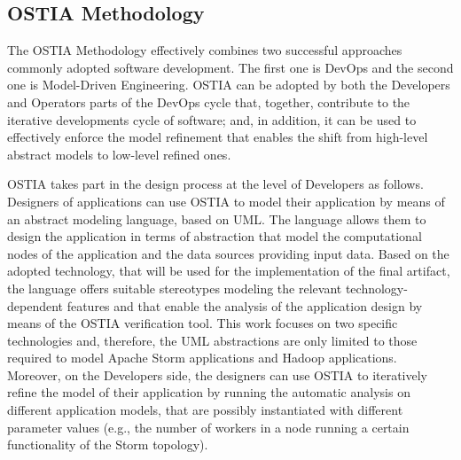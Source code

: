 \documentclass[smallextended]{svjour3}       %
\begin{document}
{\color{blue}
\subsection{OSTIA Methodology}
\label{sec:methodology}
The OSTIA Methodology effectively combines two successful approaches commonly adopted software development. 
The first one is DevOps and the second one is Model-Driven Engineering.
OSTIA can be adopted by both the Developers and Operators parts of the DevOps cycle that, together, contribute to the iterative developments cycle of software; and, in addition, it can be used to effectively enforce the model refinement that enables the shift from high-level abstract models to low-level refined ones.

OSTIA takes part in the design process at the level of Developers as follows.
Designers of applications can use OSTIA to model their application by means of an abstract modeling language, based on UML. 
The language allows them to design the application in terms of abstraction that model the computational nodes of the application and the data sources providing input data.
Based on the adopted technology, that will be used for the implementation of the final artifact, the language offers suitable stereotypes modeling the relevant technology-dependent features and that enable the analysis of the application design by means of the OSTIA verification tool.
This work focuses on two specific technologies and, therefore, the UML abstractions are only limited to those required to model Apache Storm applications and Hadoop applications.
Moreover, on the Developers side, the designers can use OSTIA to iteratively refine the model of their application by running the automatic analysis on different application models, that are possibly instantiated with different parameter values (e.g., the number of workers in a node running a certain functionality of the Storm topology).

}
\end{document}
